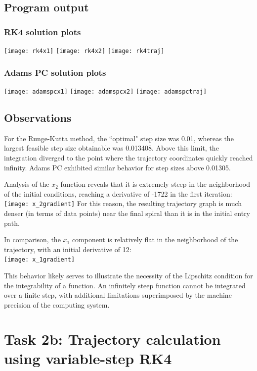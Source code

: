 \documentclass{article}
\begin{document}
	\subsection{Program output}
	
	\subsubsection{RK4 solution plots}
	\texttt{[image: rk4x1]}
	\texttt{[image: rk4x2]}
	\texttt{[image: rk4traj]}
	
	\subsubsection{Adams PC solution plots}
	\texttt{[image: adamspcx1]}
	\texttt{[image: adamspcx2]}
	\texttt{[image: adamspctraj]}
	
	\newpage
	\subsection{Observations}
	
	For the Runge-Kutta method, the ``optimal" step size was 0.01, whereas
	the largest feasible step size obtainable was 0.013408. Above this
	limit, the integration diverged to the point where the trajectory
	coordinates quickly reached infinity. Adams PC exhibited similar
	behavior for step sizes above 0.01305.
	
	Analysis of the $x_2$ function reveals that it is extremely steep in the
	neighborhood of the initial conditions, reaching a derivative of -1722
	in the first iteration:
	\texttt{[image: x\_2gradient]}
	For this reason, the resulting trajectory graph is much denser (in terms
	of data points) near the final spiral than it is in the initial entry
	path.
	
	In comparison, the $x_1$ component is relatively flat in the
	neighborhood of the trajectory, with an initial derivative of 12:\\
	\texttt{[image: x\_1gradient]}
	
	This behavior likely serves to illustrate the necessity of the Lipschitz
	condition for the integrability of a function. An infinitely steep
	function cannot be integrated over a finite step, with additional
	limitations superimposed by the machine precision of the computing
	system.
	
	\newpage
	\section{Task 2b: Trajectory calculation using variable-step RK4}
	
\end{document}
